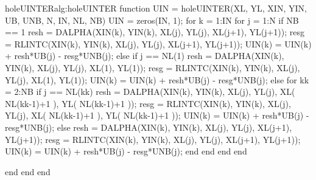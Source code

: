 \begin{matlab}{holeUINTER}{alg:holeUINTER}
function UIN = holeUINTER(XL, YL, XIN, YIN, UB, UNB, N, IN, NL, NB)
UIN = zeros(IN, 1);
for k = 1:IN
    for j = 1:N
        if NB == 1
            resh = DALPHA(XIN(k), YIN(k), XL(j), YL(j), XL(j+1), YL(j+1));
            resg = RLINTC(XIN(k), YIN(k), XL(j), YL(j), XL(j+1), YL(j+1));
            UIN(k) = UIN(k) + resh*UB(j) - resg*UNB(j);
        else
            if j == NL(1)
                resh = DALPHA(XIN(k), YIN(k), XL(j), YL(j), XL(1), YL(1));
                resg = RLINTC(XIN(k), YIN(k), XL(j), YL(j), XL(1), YL(1));
                UIN(k) = UIN(k) + resh*UB(j) - resg*UNB(j);
            else
                for kk = 2:NB
                    if j == NL(kk)
                        resh = DALPHA(XIN(k), YIN(k), XL(j), YL(j), XL( NL(kk-1)+1  ), YL( NL(kk-1)+1 ));
                        resg = RLINTC(XIN(k), YIN(k), XL(j), YL(j),  XL( NL(kk-1)+1  ), YL( NL(kk-1)+1 ));
                        UIN(k) = UIN(k) + resh*UB(j) - resg*UNB(j);
                    else
                        resh = DALPHA(XIN(k), YIN(k), XL(j), YL(j), XL(j+1), YL(j+1));
                        resg = RLINTC(XIN(k), YIN(k), XL(j), YL(j), XL(j+1), YL(j+1));
                        UIN(k) = UIN(k) + resh*UB(j) - resg*UNB(j);
                    end
                end
            end
        end

    end
end
end
\end{matlab}

